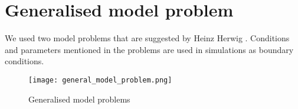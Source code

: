\documentclass[../main.tex]{subfiles}
\begin{document}
\section{Generalised model problem}

We used two model problems that are suggested by Heinz Herwig .
Conditions and parameters mentioned in the problems are used in simulations as boundary conditions.

\begin{figure}[H]
    \centering
    \texttt{[image: general\_model\_problem.png]}
    \caption{Generalised model problems}
    \label{fig:gmp}
\end{figure}
\end{document}
